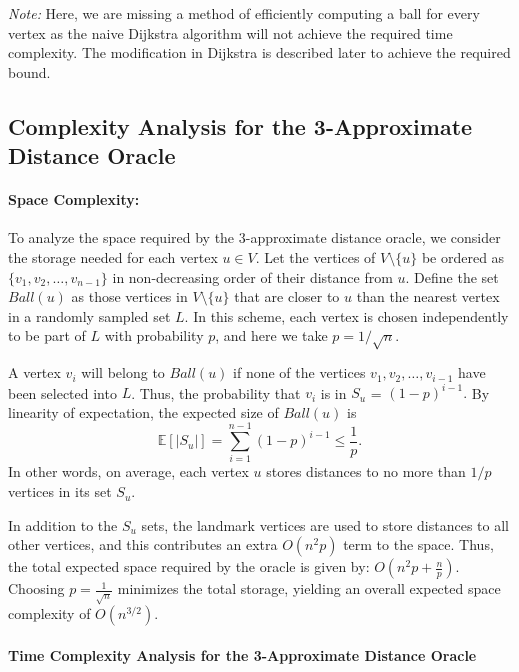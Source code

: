 \documentclass{article}
\begin{document}
\noindent \textit{Note:} Here, we are missing a method of efficiently computing a ball for every vertex as the naive Dijkstra algorithm will not achieve the required time complexity. The modification in Dijkstra is described later to achieve the required bound.

\subsection{Complexity Analysis for the 3-Approximate Distance Oracle}
\paragraph{Space Complexity:}  
To analyze the space required by the 3-approximate distance oracle, we consider the storage needed for each vertex \(u \in V\). Let the vertices of \(V \setminus \{u\}\) be ordered as \(\{v_1,v_2,\ldots,v_{n-1}\}\) in non-decreasing order of their distance from \(u\). Define the set \(Ball(u)\) as those vertices in \(V\setminus\{u\}\) that are closer to \(u\) than the nearest vertex in a randomly sampled set \(L\). In this scheme, each vertex is chosen independently to be part of \(L\) with probability \(p\), and here we take \(p=1/\sqrt{n}\).

A vertex \(v_i\) will belong to \(Ball(u)\) if none of the vertices \(v_1, v_2, \dots, v_{i-1}\) have been selected into \(L\). Thus, the probability that \(v_i\) is in \(S_u\) = \((1-p)^{i-1}.\)
By linearity of expectation, the expected size of \(Ball(u)\) is
\[
\mathbb{E}[|S_u|] = \sum_{i=1}^{n-1} (1-p)^{i-1} \le \frac{1}{p}.
\]
In other words, on average, each vertex \(u\) stores distances to no more than \(1/p\) vertices in its set \(S_u\).

In addition to the \(S_u\) sets, the landmark vertices are used to store distances to all other vertices, and this contributes an extra \(O(n^2 p)\) term to the space. Thus, the total expected space required by the oracle is given by:
\(
O\left(n^2p + \frac{n}{p}\right).
\)
Choosing \(p = \frac{1}{\sqrt{n}}\) minimizes the total storage, yielding an overall expected space complexity of
\(
O\left(n^{3/2}\right).
\)

\paragraph{Time Complexity Analysis for the 3-Approximate Distance Oracle}

\end{document}
